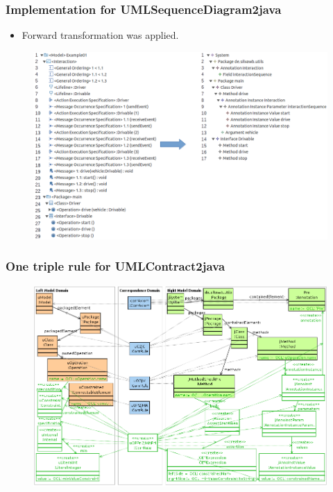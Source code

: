 \documentclass{beamer}
\begin{document}
\begin{frame}[t]
	\frametitle{Implementation for UMLSequenceDiagram2java}	
	\vskip -10pt
	\begin{itemize}
		\item Forward transformation was applied.
	\end{itemize}
	\begin{figure}
		\includegraphics[width=.9\textwidth]{umlSequenceDiagram2java_Example01}
	\end{figure}
\end{frame}

\begin{frame}[t]
	\frametitle{One triple rule for UMLContract2java}
	\begin{figure}
		\includegraphics[width=.9\textwidth]{uOPPreInt2jMAPreAssert}
	\end{figure}
\end{frame}
\end{document}
